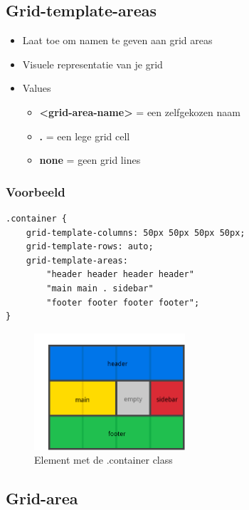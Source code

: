 \documentclass{article}
\newcommand{\bold}[1]{\textbf{#1}}
\begin{document}
\subsection{Grid-template-areas}

\begin{itemize}
    \item Laat toe om namen te geven aan grid areas
    \item Visuele representatie van je grid
    \item Values
    \begin{itemize}
        \item \bold{<grid-area-name>} =  een zelfgekozen naam
        \item \bold{.} = een lege grid cell
        \item \bold{none} = geen grid lines
    \end{itemize}
\end{itemize}

\subsubsection{Voorbeeld}

\begin{verbatim}
.container {
    grid-template-columns: 50px 50px 50px 50px;
    grid-template-rows: auto;
    grid-template-areas:
        "header header header header"
        "main main . sidebar"
        "footer footer footer footer";
}
\end{verbatim}


\begin{figure}[H]
    \centering
    \includegraphics[width=0.5\textwidth]{grid-template-areas.png}
    \caption{Element met de .container class}
\end{figure}

\subsection{Grid-area}
\end{document}
